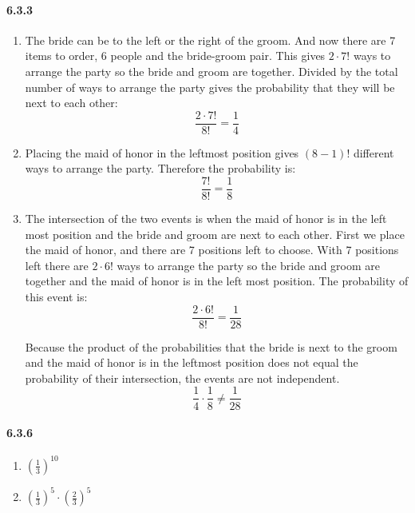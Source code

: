 \documentclass[11pt, letterpaper, twocolumn, fleqn]{article}
\begin{document}
\paragraph{6.3.3}
\begin{enumerate}
  \item The bride can be to the left or the right of the groom. And now there are 7 items to order, 6 people and the bride-groom pair. This gives $2 \cdot 7!$ ways to arrange the party so the bride and groom are together. Divided by the total number of ways to arrange the party gives the probability that they will be next to each other:
    $$\frac{2\cdot 7!}{8!} = \frac{1}{4}$$
    
  \item Placing the maid of honor in the leftmost position gives $(8-1)!$ different ways to arrange the party. Therefore the probability is:
    $$\frac{7!}{8!} = \frac{1}{8}$$
    
  \item The intersection of the two events is when the maid of honor is in the left most position and the bride and groom are next to each other. First we place the maid of honor, and there are 7 positions left to choose. With 7 positions left there are $2 \cdot 6!$ ways to arrange the party so the bride and groom are together and the maid of honor is in the left most position. The probability of this event is:
    $$\frac{2 \cdot 6!}{8!} = \frac{1}{28}$$
    
  Because the product of the probabilities that the bride is next to the groom and the maid of honor is in the leftmost position does not equal the probability of their intersection, the events are not independent.
    $$\frac{1}{4} \cdot \frac{1}{8} \neq \frac{1}{28}$$
\end{enumerate}

\paragraph{6.3.6}
\begin{enumerate}
  \item $\left(\frac{1}{3}\right)^{10}$
  \item $\left(\frac{1}{3}\right)^{5} \cdot \left(\frac{2}{3}\right)^{5}$
\end{enumerate}
\end{document}
